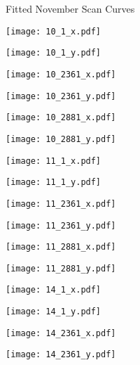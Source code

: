 \documentclass[8pt]{beamer}
\begin{document}
\begin{frame}
\centering
\large{Fitted November Scan Curves}
\end{frame}
\begin{frame}
\center
\texttt{[image: 10\_1\_x.pdf]}
\end{frame}
\begin{frame}
\center
\texttt{[image: 10\_1\_y.pdf]}
\end{frame}
\begin{frame}
\center
\texttt{[image: 10\_2361\_x.pdf]}
\end{frame}
\begin{frame}
\center
\texttt{[image: 10\_2361\_y.pdf]}
\end{frame}
\begin{frame}
\center
\texttt{[image: 10\_2881\_x.pdf]}
\end{frame}
\begin{frame}
\center
\texttt{[image: 10\_2881\_y.pdf]}
\end{frame}
\begin{frame}
\center
\texttt{[image: 11\_1\_x.pdf]}
\end{frame}
\begin{frame}
\center
\texttt{[image: 11\_1\_y.pdf]}
\end{frame}
\begin{frame}
\center
\texttt{[image: 11\_2361\_x.pdf]}
\end{frame}
\begin{frame}
\center
\texttt{[image: 11\_2361\_y.pdf]}
\end{frame}
\begin{frame}
\center
\texttt{[image: 11\_2881\_x.pdf]}
\end{frame}
\begin{frame}
\center
\texttt{[image: 11\_2881\_y.pdf]}
\end{frame}
\begin{frame}
\center
\texttt{[image: 14\_1\_x.pdf]}
\end{frame}
\begin{frame}
\center
\texttt{[image: 14\_1\_y.pdf]}
\end{frame}
\begin{frame}
\center
\texttt{[image: 14\_2361\_x.pdf]}
\end{frame}
\begin{frame}
\center
\texttt{[image: 14\_2361\_y.pdf]}
\end{frame}
\end{document}
